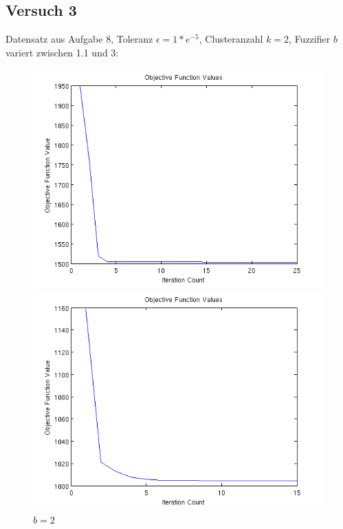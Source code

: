 \FloatBarrier
\subsection*{Versuch 3}
Datensatz aus Aufgabe 8, Toleranz $\epsilon = 1*e^{-5}$, Clusteranzahl $k = 2$, Fuzzifier $b$ variert zwischen 1.1 und 3:
\begin{figure}[h]
  \begin{minipage}[b]{0.5\linewidth}
    \centering
    \includegraphics[width=1\linewidth]{../img/data8b11e5c2.png}
    \caption{$b = 1.1$}
  \end{minipage}
  \begin{minipage}[b]{0.5\linewidth}
    \centering
    \includegraphics[width=1\linewidth]{../img/data8b2e5c2.png}
    \caption{$b = 2$}	
  \end{minipage}
\end{figure}
